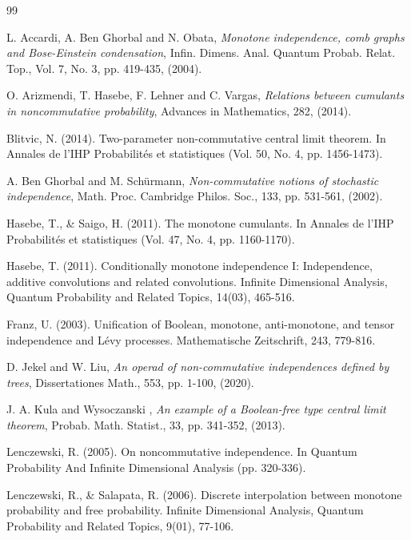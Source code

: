 \documentclass[a4paper,12pt]{extarticle}
\theoremstyle{definition}
\theoremstyle{remark}
\begin{document}
\begin{thebibliography}{99}

 
	
	 L. Accardi, A. Ben Ghorbal and N. Obata, \emph{Monotone independence, comb graphs and Bose-Einstein condensation}, Infin. Dimens. Anal. Quantum Probab. Relat. Top., Vol. 7, No. 3, pp. 419-435, (2004).
 
	 O. Arizmendi, T. Hasebe, F. Lehner and C. Vargas, \emph{Relations between cumulants in noncommutative probability}, Advances in Mathematics, 282, (2014).

  Blitvic, N. (2014). Two-parameter non-commutative central limit theorem. In Annales de l'IHP Probabilités et statistiques (Vol. 50, No. 4, pp. 1456-1473).

	
	 A. Ben Ghorbal and M. Schürmann, \emph{Non-commutative notions of stochastic independence}, Math. Proc. Cambridge Philos. Soc., 133, pp. 531-561, (2002).

  Hasebe, T., \& Saigo, H. (2011). The monotone cumulants. In Annales de l'IHP Probabilités et statistiques (Vol. 47, No. 4, pp. 1160-1170).


 Hasebe, T. (2011). Conditionally monotone independence I: Independence, additive convolutions and related convolutions. Infinite Dimensional Analysis, Quantum Probability and Related Topics, 14(03), 465-516.


 Franz, U. (2003). Unification of Boolean, monotone, anti-monotone, and tensor independence and Lévy processes. Mathematische Zeitschrift, 243, 779-816.


	
	 D. Jekel and W. Liu, \emph{An operad of non-commutative independences defined by trees}, Dissertationes Math., 553, pp. 1-100, (2020). 

 
	 J. A. Kula and Wysoczanski , \emph{An example of a Boolean-free type central limit theorem}, Probab. Math. Statist., 33, pp. 341-352, (2013).
	

 Lenczewski, R. (2005). On noncommutative independence. In Quantum Probability And Infinite Dimensional Analysis (pp. 320-336).


  Lenczewski, R., \& Salapata, R. (2006). Discrete interpolation between monotone probability and free probability. Infinite Dimensional Analysis, Quantum Probability and Related Topics, 9(01), 77-106.


\end{thebibliography}
\end{document}
